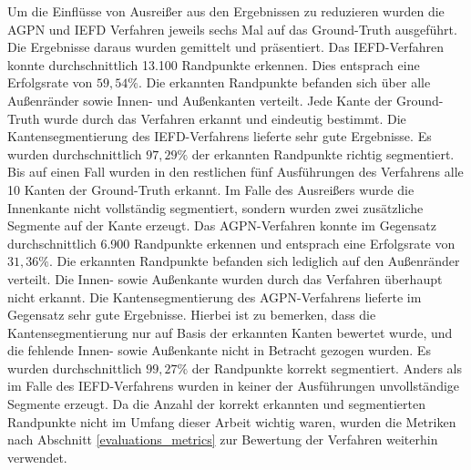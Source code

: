 Um die Einflüsse von Ausreißer aus den Ergebnissen zu reduzieren wurden die AGPN und IEFD Verfahren jeweils sechs Mal auf das Ground-Truth ausgeführt. Die Ergebnisse daraus wurden gemittelt und präsentiert. Das IEFD-Verfahren konnte durchschnittlich 13.100 Randpunkte erkennen. Dies entsprach eine Erfolgsrate von $59,54\%$. Die erkannten Randpunkte befanden sich über alle Außenränder sowie Innen- und Außenkanten verteilt. Jede Kante der Ground-Truth wurde durch das Verfahren erkannt und eindeutig bestimmt. Die Kantensegmentierung des IEFD-Verfahrens lieferte sehr gute Ergebnisse. Es wurden durchschnittlich $97,29\%$ der erkannten Randpunkte richtig segmentiert. Bis auf einen Fall wurden in den restlichen fünf Ausführungen des Verfahrens alle 10 Kanten der Ground-Truth erkannt. Im Falle des Ausreißers wurde die Innenkante nicht vollständig segmentiert, sondern wurden zwei zusätzliche Segmente auf der Kante erzeugt. Das AGPN-Verfahren konnte im Gegensatz durchschnittlich 6.900 Randpunkte erkennen und entsprach eine Erfolgsrate von $31,36\%$. Die erkannten Randpunkte befanden sich lediglich auf den Außenränder verteilt. Die Innen- sowie Außenkante wurden durch das Verfahren überhaupt nicht erkannt. Die Kantensegmentierung des AGPN-Verfahrens lieferte im Gegensatz sehr gute Ergebnisse. Hierbei ist zu bemerken, dass die Kantensegmentierung nur auf Basis der erkannten Kanten bewertet wurde, und die fehlende Innen- sowie Außenkante nicht in Betracht gezogen wurden. Es wurden durchschnittlich $99,27\%$ der Randpunkte korrekt segmentiert. Anders als im Falle des IEFD-Verfahrens wurden in keiner der Ausführungen unvollständige Segmente erzeugt. Da die Anzahl der korrekt erkannten und segmentierten Randpunkte nicht im Umfang dieser Arbeit wichtig waren, wurden die Metriken nach Abschnitt \ref{evaluations_metrics} zur Bewertung der Verfahren weiterhin verwendet. 


